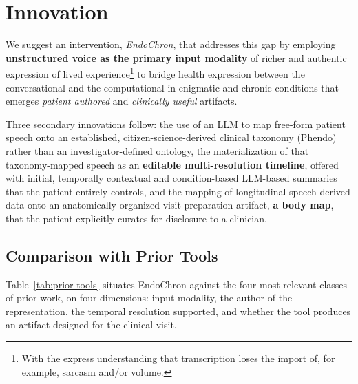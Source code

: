 \section{Innovation}

We suggest an intervention, \textit{EndoChron}, that addresses this gap by employing \textbf{unstructured voice as the primary input modality} of richer and authentic expression of lived experience\footnote{With the express understanding that transcription loses the import of, for example, sarcasm and/or volume.} to bridge health expression between the conversational and the computational in enigmatic and chronic conditions that emerges \textit{patient authored} and \textit{clinically useful} artifacts.

Three secondary innovations follow:  the use of an LLM to map free-form patient speech onto an established, citizen-science-derived clinical taxonomy (Phendo) rather than an investigator-defined ontology,  the materialization of that taxonomy-mapped speech as an \textbf{editable multi-resolution timeline}, offered with initial, temporally contextual and condition-based LLM-based summaries that the patient entirely controls, and  the mapping of longitudinal speech-derived data onto an anatomically organized visit-preparation artifact, \textbf{a body map}, that the patient explicitly curates for disclosure to a clinician.

\subsection{Comparison with Prior Tools}

Table~\ref{tab:prior-tools} situates EndoChron against the four most relevant classes of prior work, on four dimensions: input modality, the author of the representation, the temporal resolution supported, and whether the tool produces an artifact designed for the clinical visit.

